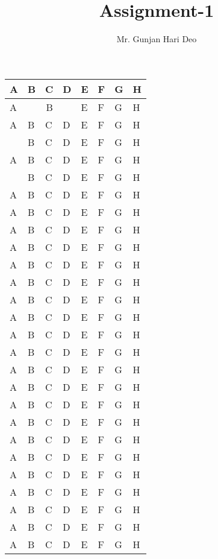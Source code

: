 \documentclass[12pt,a4paper]{article}
\author{Mr. Gunjan Hari Deo}
\title{Assignment-1}
\begin{document}
\maketitle
\begin{longtable}{|p{}|p{}|p{}|p{}|p{}|p{}|p{}|p{}|}
\hline
A & B & C & D & E & F & G & H \\  \hline
A & \multicolumn{3}{|c|}{B}  & E & F & G & H \\  \hline
A & B & C & D & E & F & G & H \\  \hline
\multirow{3}{*}{A} & B & C & D & E & F & G & H \\  \cline{2-8}
 & B & C & D & E & F & G & H \\  \cline{2-8}
 & B & C & D & E & F & G & H \\  \hline
A & B & C & D & E & F & G & H \\  \hline
A & B & C & D & E & F & G & H \\  \hline
A & B & C & D & E & F & G & H \\  \hline
A & B & C & D & E & F & G & H \\  \hline
A & B & C & D & E & F & G & H \\  \hline
A & B & C & D & E & F & G & H \\  \hline
A & B & C & D & E & F & G & H \\  \hline
A & B & C & D & E & F & G & H \\  \hline
A & B & C & D & E & F & G & H \\  \hline
A & B & C & D & E & F & G & H \\  \hline
A & B & C & D & E & F & G & H \\  \hline
A & B & C & D & E & F & G & H \\  \hline
A & B & C & D & E & F & G & H \\  \hline
A & B & C & D & E & F & G & H \\  \hline
A & B & C & D & E & F & G & H \\  \hline
A & B & C & D & E & F & G & H \\  \hline
A & B & C & D & E & F & G & H \\  \hline
A & B & C & D & E & F & G & H \\  \hline
A & B & C & D & E & F & G & H \\  \hline
A & B & C & D & E & F & G & H \\  \hline
A & B & C & D & E & F & G & H \\  \hline

\end{longtable}
\end{document}
